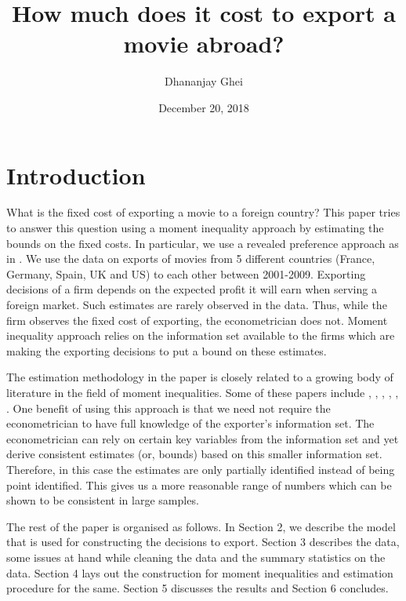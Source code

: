 \documentclass[11pt, letterpaper]{article} \usepackage{amsmath}
\title{How much does it cost to export a movie abroad?} \author{Dhananjay Ghei} \date{December 20, 2018}
\begin{document}
\maketitle
\begin{abstract}

\end{abstract}
\newpage
\tableofcontents
\newpage
\section{Introduction}
What is the fixed cost of exporting a movie to a foreign country? This
paper tries to answer this question using a moment inequality approach
by estimating the bounds on the fixed costs. In particular, we use a
revealed preference approach as in \citep{pakes2015}. We use the data
on exports of movies from 5 different countries (France, Germany,
Spain, UK and US) to each other between 2001-2009.  Exporting
decisions of a firm depends on the expected profit it will earn when
serving a foreign market. Such estimates are rarely observed in the
data. Thus, while the firm observes the fixed cost of exporting, the
econometrician does not. Moment inequality approach relies on the
information set available to the firms which are making the exporting
decisions to put a bound on these estimates.

The estimation methodology in the paper is closely related to a
growing body of literature in the field of moment inequalities. Some
of these papers include \citet{chernozhukov2013}, \citet{manski2004},
\citet{pakes2010}, \citet{andrews2010}, \citet{holmes2011},
\citet{ho2009}. One benefit of using this approach is that we need not
require the econometrician to have full knowledge of the exporter's
information set. The econometrician can rely on certain key variables
from the information set and yet derive consistent estimates (or,
bounds) based on this smaller information set. Therefore, in this case
the estimates are only partially identified instead of being point
identified. This gives us a more reasonable range of numbers which can
be shown to be consistent in large samples.

The rest of the paper is organised as follows. In Section 2, we
describe the model that is used for constructing the decisions to
export. Section 3 describes the data, some issues at hand while
cleaning the data and the summary statistics on the data. Section 4
lays out the construction for moment inequalities and estimation
procedure for the same. Section 5 discusses the results and Section 6
concludes.
\end{document}

